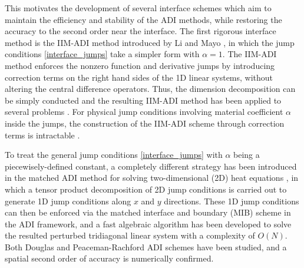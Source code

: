 \documentclass[dissertation]{uathesis}
\begin{document}
\begin{body}
\begin{flushleft}
\hspace{1cm} This motivates the development of several interface schemes \cite{Iimayo1993,li1999numerical, liu2013iim, liu2014dimension,zhao2015matched,li2017matched} which aim to maintain the efficiency and stability of the ADI methods, while restoring the accuracy to the second order near the interface. The first rigorous interface method is the IIM-ADI method introduced by Li and Mayo \cite{Iimayo1993}, in which the jump conditions \eqref{interface_jumps} take a simpler form with $\alpha=1$. The IIM-ADI method enforces the nonzero function and derivative jumps  by introducing correction terms on the right hand sides of the 1D linear systems, without altering the central difference operators. Thus, the dimension decomposition can be simply conducted and the resulting IIM-ADI method has been applied to several problems \cite{liu2013iim, liu2014dimension}. For physical jump conditions involving material coefficient $\alpha$ inside the jumps, the construction of the IIM-ADI scheme through correction terms is intractable \cite{li1999numerical}. 

\hspace{1cm} To treat the general jump conditions \eqref{interface_jumps} with $\alpha$ being a piecewisely-defined constant, a completely different strategy has been introduced in the matched ADI method for solving  two-dimensional (2D) heat equations \cite{zhao2015matched,li2017matched}, in which a tensor product decomposition of 2D jump conditions is carried out to generate 1D jump conditions along $x$ and $y$ directions. These 1D jump conditions can then be enforced via the matched interface and boundary (MIB) scheme \cite{zhao2004high, zhou2006high,yu2007three,yu2007matched} in the ADI framework, 
and a fast algebraic algorithm has been developed to solve the resulted perturbed tridiagonal linear system with a complexity of $O(N)$. Both Douglas  \cite{zhao2015matched} and Peaceman-Rachford \cite{li2017matched} ADI schemes have been studied, and a spatial second order of accuracy is numerically confirmed. 


\end{flushleft}
\end{body}
\end{document}
